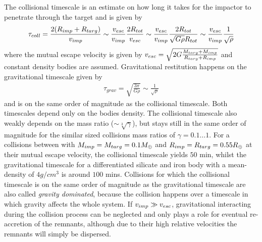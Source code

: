 The collisional timescale is an estimate on how long it takes for the impactor to penetrate through the target and is given by
\begin{align}
\tau_{coll} = \frac{2 (R_{imp} + R_{targ})}{v_{imp}} \sim \frac{v_{esc}}{v_{imp}} \frac{2 R_{tot}}{v_{esc}} \sim \frac{v_{esc}}{v_{imp}}  \frac{2 R_{tot}}{\sqrt{G \rho} R_{tot}} \sim \frac{v_{esc}}{v_{imp}} \frac{1}{\sqrt{\rho}}
\end{align}
where the mutual escape velocity is given by $v_{esc} = \sqrt{ 2 G \frac{M_{targ} + M_{imp}}{R_{targ} + R_{imp}} }$ and constant density bodies are assumed. Gravitational restitution happens on the gravitational timescale given by
\begin{align}
\tau_{grav} = \sqrt{\frac{3 \pi }{G \rho} } \sim \frac{1}{\sqrt{\rho}}
\end{align}
and is on the same order of magnitude as the collisional timescale. Both timescales depend only on the bodies density. The collisional timescale also weakly depends on the mass ratio ($\sim \sqrt[3]{\gamma}$), but stays still in the same order of magnitude for the similar sized collisions mass ratios of $\gamma = 0.1 \dots 1$. For a collisions between with $M_{imp} = M_{targ} = 0.1M_{\oplus}$ and $R_{imp} = R_{targ} = 0.55 R_{\oplus}$ at their mutual escape velocity, the collisional timescale yields $50$ min, whilst the gravitational timescale for a differentiated silicate and iron body with a mean-density of $4g/cm^3$ is around $100$ mins. Collisions for which the collisional timescale is on the same order of magnitude as the gravitational timescale are also called \emph{gravity dominated}, because the collision happens over a timescale in which gravity affects the whole system. If $v_{imp} \gg v_{esc}$, gravitational interacting during the collision process can be neglected and only plays a role for eventual re-accretion  of the remnants, although due to their high relative velocities the remnants will simply be dispersed.

